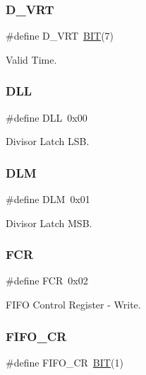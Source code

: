 \subsubsection{\texorpdfstring{D\+\_\+\+V\+RT}{D\_VRT}}
{\footnotesize\ttfamily \#define D\+\_\+\+V\+RT~\hyperlink{group___serial_ga3a8ea58898cb58fc96013383d39f482c}{B\+IT}(7)}



Valid Time. 

\hypertarget{group___serial_ga4466639cd64ebf372a621168c5e25964}{}\label{group___serial_ga4466639cd64ebf372a621168c5e25964} 
\subsubsection{\texorpdfstring{D\+LL}{DLL}}
{\footnotesize\ttfamily \#define D\+LL~0x00}



Divisor Latch L\+SB. 

\hypertarget{group___serial_ga3b48b12dc65f62dd40ab1163fe7997fb}{}\label{group___serial_ga3b48b12dc65f62dd40ab1163fe7997fb} 
\subsubsection{\texorpdfstring{D\+LM}{DLM}}
{\footnotesize\ttfamily \#define D\+LM~0x01}



Divisor Latch M\+SB. 

\hypertarget{group___serial_ga264b36b13386e3f62fe69e04711bc006}{}\label{group___serial_ga264b36b13386e3f62fe69e04711bc006} 
\subsubsection{\texorpdfstring{F\+CR}{FCR}}
{\footnotesize\ttfamily \#define F\+CR~0x02}



F\+I\+FO Control Register -\/ Write. 

\hypertarget{group___serial_gaf6a8e6e80294a60dfd5f39cf965c4a13}{}\label{group___serial_gaf6a8e6e80294a60dfd5f39cf965c4a13} 
\subsubsection{\texorpdfstring{F\+I\+F\+O\+\_\+\+CR}{FIFO\_CR}}
{\footnotesize\ttfamily \#define F\+I\+F\+O\+\_\+\+CR~\hyperlink{group___serial_ga3a8ea58898cb58fc96013383d39f482c}{B\+IT}(1)}



